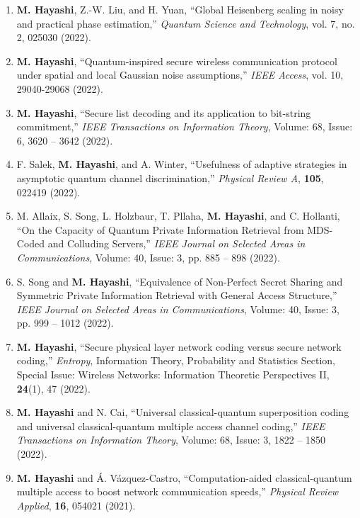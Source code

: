 \documentclass[a4paper,12pt,oneside]{article}
\begin{document}
\begin{enumerate}
\item
\textbf{M. Hayashi}, Z.-W. Liu, and H. Yuan,
``Global Heisenberg scaling in noisy and practical phase estimation,''
{\em Quantum Science and Technology},
vol. 7, no. 2, 025030 (2022).

\item
\textbf{M. Hayashi},
``Quantum-inspired secure wireless communication protocol under spatial and local Gaussian noise assumptions,''
{\em IEEE Access},
vol. 10, 29040-29068 (2022).

\item
\textbf{M. Hayashi},
``Secure list decoding and its application to bit-string commitment,''
{\em IEEE Transactions on Information Theory},
Volume: 68, Issue: 6, 3620 – 3642 (2022).

\item
F. Salek, \textbf{M. Hayashi}, and A. Winter,
``Usefulness of adaptive strategies in asymptotic quantum channel discrimination,''
{\em Physical Review A},
{\bf 105}, 022419 (2022).

\item
M. Allaix, S. Song, L. Holzbaur, T. Pllaha, \textbf{M. Hayashi}, and C. Hollanti,
``On the Capacity of Quantum Private Information Retrieval from MDS-Coded and Colluding Servers,''
{\em IEEE Journal on Selected Areas in Communications},
Volume: 40, Issue: 3, pp. 885 – 898 (2022).

\item
S. Song and \textbf{M. Hayashi},
``Equivalence of Non-Perfect Secret Sharing and Symmetric Private Information Retrieval with General Access Structure,''
{\em IEEE Journal on Selected Areas in Communications},
Volume: 40, Issue: 3, pp. 999 – 1012 (2022).

\item
\textbf{M. Hayashi},
``Secure physical layer network coding versus secure network coding,''
{\em Entropy},
Information Theory, Probability and Statistics Section, Special Issue: 
Wireless Networks: Information Theoretic Perspectives II, 
{\bf 24}(1), 47 (2022).

\item
\textbf{M. Hayashi} and N. Cai,
``Universal classical-quantum superposition coding and universal classical-quantum multiple access channel coding,''
{\em IEEE Transactions on Information Theory},
Volume: 68, Issue: 3, 1822 – 1850 (2022).

\item
\textbf{M. Hayashi} and \'{A}. V\'{a}zquez-Castro,
``Computation-aided classical-quantum multiple access to boost network communication speeds,''
{\em Physical Review Applied},
{\bf 16}, 054021 (2021).


\end{enumerate}
\end{document}
